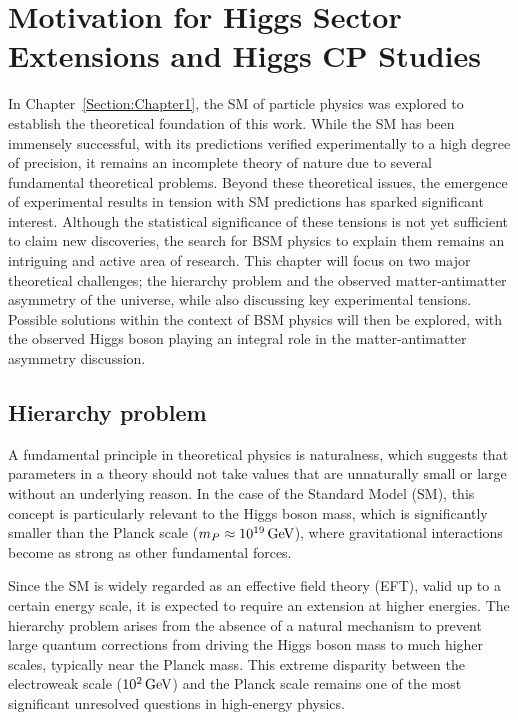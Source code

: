 \chapter{Motivation for Higgs Sector Extensions and Higgs CP Studies}
\thispagestyle{plain}  %
\pagestyle{chapterpages}
\label{Section:Chapter2}

In Chapter~\ref{Section:Chapter1}, the SM of particle physics was explored to establish the theoretical foundation of this work. While the SM has been immensely successful, with its predictions verified experimentally to a high degree of precision, it remains an incomplete theory of nature due to several fundamental theoretical problems. Beyond these theoretical issues, the emergence of experimental results in tension with SM predictions has sparked significant interest. Although the statistical significance of these tensions is not yet sufficient to claim new discoveries, the search for BSM physics to explain them remains an intriguing and active area of research. This chapter will focus on two major theoretical challenges; the hierarchy problem and the observed matter-antimatter asymmetry of the universe, while also discussing key experimental tensions. Possible solutions within the context of BSM physics will then be explored, with the observed Higgs boson playing an integral role in the matter-antimatter asymmetry discussion.

\section{Hierarchy problem}

A fundamental principle in theoretical physics is naturalness, which suggests that parameters in a theory should not take values that are unnaturally small or large without an underlying reason. In the case of the Standard Model (SM), this concept is particularly relevant to the Higgs boson mass, which is significantly smaller than the Planck scale ($m_P \approx 10^{19} \,\text{Ge\hspace{-.08em}V}$), where gravitational interactions become as strong as other fundamental forces.

Since the SM is widely regarded as an effective field theory (EFT), valid up to a certain energy scale, it is expected to require an extension at higher energies. The hierarchy problem arises from the absence of a natural mechanism to prevent large quantum corrections from driving the Higgs boson mass to much higher scales, typically near the Planck mass. This extreme disparity between the electroweak scale ($10^2 \,\text{Ge\hspace{-.08em}V}$) and the Planck scale remains one of the most significant unresolved questions in high-energy physics.

